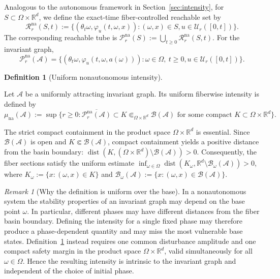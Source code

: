 \documentclass[pdflatex,sn-mathphys-num]{sn-jnl}
\numberwithin{equation}{section}
\theoremstyle{thmstyleone}%
\theoremstyle{definition}
\newtheorem{definition}[theorem]{Definition}
\theoremstyle{remark}
\newtheorem{remark}[theorem]{Remark}
\begin{document}
Analogous to the autonomous framework in Section~\ref{sec:intensity}, for $S\subset\Omega\times\mathbb R^d$, we define the exact-time fiber-controlled reachable set by
\[
    \mathcal R_r^{\mathrm{na}}(S,t)
    :=
    \bigl\{
        (\theta_t\omega,\varphi_u(t,\omega,x)):
        (\omega,x)\in S,
        u\in\mathcal U_r([0,t])
    \bigr\}.
\]
The corresponding reachable tube is
    $\mathcal P_r^{\mathrm{na}}(S)
    :=
    \bigcup_{t\geq0}
    \mathcal R_r^{\mathrm{na}}(S,t)$.
For the invariant graph,
\[
    \mathcal P_r^{\mathrm{na}}(\mathcal A)
    =
    \bigl\{
    (\theta_t\omega,
     \varphi_u(t,\omega,a(\omega))):
    \omega\in\Omega,\ t\geq0,
    u\in\mathcal U_r([0,t])
    \bigr\}.
\]

\begin{definition}[Uniform nonautonomous intensity]
\label{def:nonautonomous-intensity}

Let $\mathcal A$ be a uniformly attracting invariant graph.
Its uniform fiberwise intensity is defined by
\[
    \mu_{\mathrm{na}}(\mathcal A)
    :=
    \sup\biggl\{
    r\geq0:
    \overline{
        \mathcal P_r^{\mathrm{na}}(\mathcal A)
    }
    \subset K
    \Subset_{\Omega\times\mathbb R^d}
    \mathcal B(\mathcal A)
    \text{ for some compact }
    K\subset\Omega\times\mathbb R^d
    \biggr\}.
\]
\end{definition}

The strict compact containment in the product space $\Omega\times\mathbb R^d$ is essential. Since $\mathcal B(\mathcal A)$ is open and $K\Subset\mathcal B(\mathcal A)$, compact containment yields a positive distance from the basin boundary:
$\operatorname{dist}
    \left(
        K,
        (\Omega\times\mathbb R^d)
        \setminus
        \mathcal B(\mathcal A)
    \right)
    >0$.
Consequently, the fiber sections satisfy the uniform estimate
$\inf_{\omega\in\Omega}
    \operatorname{dist}
    \left(
        K_\omega,
        \mathbb R^d\setminus
        \mathcal B_\omega(\mathcal A)
    \right)
    >0$,
where
$K_\omega
:=
\{x:(\omega,x)\in K\}$ and
$\mathcal B_\omega(\mathcal A)
:=
\{x:(\omega,x)\in\mathcal B(\mathcal A)\}$.

\begin{remark}[Why the definition is uniform over the base]
\label{rem:uniform-over-base}
In a nonautonomous system the stability properties of an invariant graph may depend on the base point $\omega$. In particular, different phases may have different distances from the fiber basin boundary. Defining the intensity for a single fixed phase may therefore produce a phase-dependent quantity and may miss the most vulnerable base states. Definition~\ref{def:nonautonomous-intensity} instead requires one common disturbance amplitude and one compact safety margin in the product space $\Omega\times\mathbb R^d$, valid simultaneously for all $\omega\in\Omega$. Hence the resulting intensity is intrinsic to the invariant graph and independent of the choice of initial phase.
\end{remark}
\end{document}
